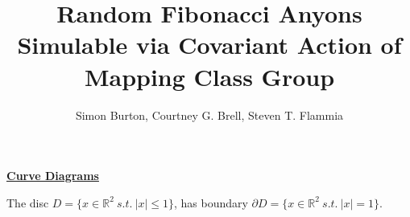 \documentclass[12pt,a4paper]{article}
\begin{document}
\title{Random Fibonacci Anyons Simulable via Covariant Action of Mapping Class Group}

\author{Simon Burton, Courtney G. Brell, Steven T. Flammia}


%
%

\maketitle



\def\Complex {C}
\def\tensor{\otimes}
\def\Tensor{\bigotimes}
\def\bra #1{\langle #1|}
\def\ket #1{|#1\rangle}
\def\braket #1#2{\langle #1|#2 \rangle}



\def\mathZ{\mathbb{Z}}
\def\mathR{\mathbb{R}}


\def\heading #1{\vskip 20pt \noindent\underline{\large \bf #1}\vskip 5pt}

\def\important #1{\underline{\bf #1}}



\heading{Curve Diagrams}

The disc $D = \{ x\in \mathR^2\ s.t.\ |x|\leq 1 \} $,
has boundary $\partial D = \{ x\in \mathR^2\ s.t.\ |x|=1 \} $.
\end{document}
